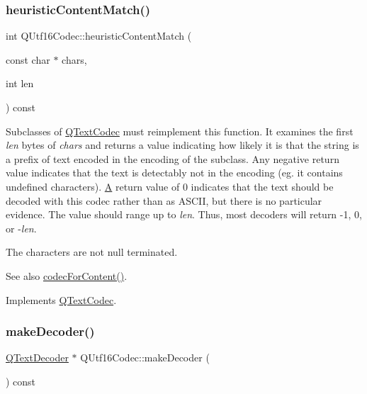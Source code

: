\subsubsection{\texorpdfstring{heuristicContentMatch()}{heuristicContentMatch()}}
{\footnotesize\ttfamily int Q\+Utf16\+Codec\+::heuristic\+Content\+Match (\begin{DoxyParamCaption}\item[{const char $\ast$}]{chars,  }\item[{int}]{len }\end{DoxyParamCaption}) const\hspace{0.3cm}{\ttfamily [virtual]}}

Subclasses of \mbox{\hyperlink{class_q_text_codec}{Q\+Text\+Codec}} must reimplement this function. It examines the first {\itshape len} bytes of {\itshape chars} and returns a value indicating how likely it is that the string is a prefix of text encoded in the encoding of the subclass. Any negative return value indicates that the text is detectably not in the encoding (eg. it contains undefined characters). \mbox{\hyperlink{class_a}{A}} return value of 0 indicates that the text should be decoded with this codec rather than as A\+S\+C\+II, but there is no particular evidence. The value should range up to {\itshape len}. Thus, most decoders will return -\/1, 0, or -\/{\itshape len}.

The characters are not null terminated.

\begin{DoxySeeAlso}{See also}
\mbox{\hyperlink{class_q_text_codec_aeb3ec365c6c4f1812689a2b66ed09e27}{codec\+For\+Content()}}. 
\end{DoxySeeAlso}


Implements \mbox{\hyperlink{class_q_text_codec_a4780a608d950994a927de727bb07b9fe}{Q\+Text\+Codec}}.

\mbox{\label{class_q_utf16_codec_a1134a8f386ac3b775ad60381e373d28a}} 
\subsubsection{\texorpdfstring{makeDecoder()}{makeDecoder()}}
{\footnotesize\ttfamily \mbox{\hyperlink{class_q_text_decoder}{Q\+Text\+Decoder}} $\ast$ Q\+Utf16\+Codec\+::make\+Decoder (\begin{DoxyParamCaption}{ }\end{DoxyParamCaption}) const\hspace{0.3cm}{\ttfamily [virtual]}}

